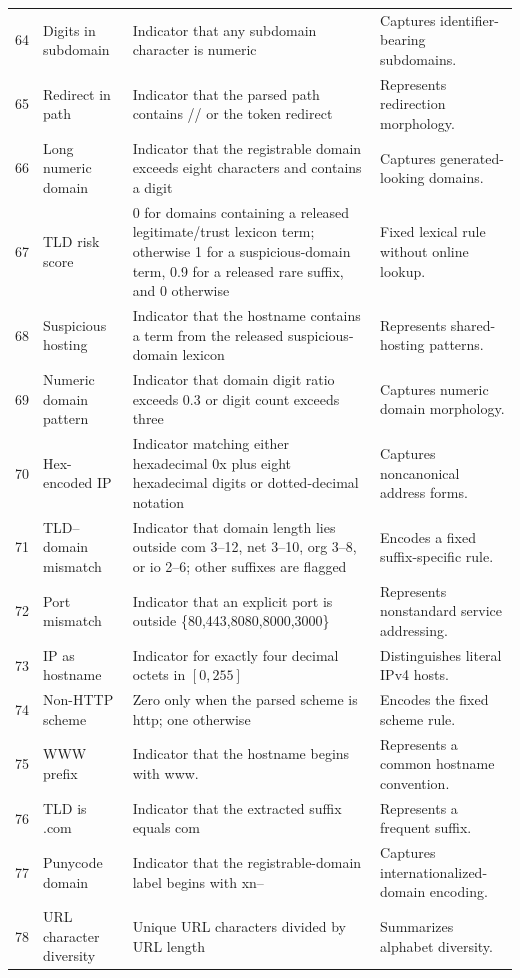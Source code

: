 \documentclass[10pt]{article}
\begin{document}
\begin{longtable}{r L{3.4cm} L{5.1cm} L{6.0cm}}
64 & Digits in subdomain & Indicator that any subdomain character is numeric & Captures identifier-bearing subdomains. \\
65 & Redirect in path & Indicator that the parsed path contains // or the token redirect & Represents redirection morphology. \\
66 & Long numeric domain & Indicator that the registrable domain exceeds eight characters and contains a digit & Captures generated-looking domains. \\
67 & TLD risk score & 0 for domains containing a released legitimate/trust lexicon term; otherwise 1 for a suspicious-domain term, 0.9 for a released rare suffix, and 0 otherwise & Fixed lexical rule without online lookup. \\
68 & Suspicious hosting & Indicator that the hostname contains a term from the released suspicious-domain lexicon & Represents shared-hosting patterns. \\
69 & Numeric domain pattern & Indicator that domain digit ratio exceeds 0.3 or digit count exceeds three & Captures numeric domain morphology. \\
70 & Hex-encoded IP & Indicator matching either hexadecimal 0x plus eight hexadecimal digits or dotted-decimal notation & Captures noncanonical address forms. \\
71 & TLD--domain mismatch & Indicator that domain length lies outside com 3--12, net 3--10, org 3--8, or io 2--6; other suffixes are flagged & Encodes a fixed suffix-specific rule. \\
72 & Port mismatch & Indicator that an explicit port is outside \{80,443,8080,8000,3000\} & Represents nonstandard service addressing. \\
73 & IP as hostname & Indicator for exactly four decimal octets in $[0,255]$ & Distinguishes literal IPv4 hosts. \\
74 & Non-HTTP scheme & Zero only when the parsed scheme is http; one otherwise & Encodes the fixed scheme rule. \\
75 & WWW prefix & Indicator that the hostname begins with www. & Represents a common hostname convention. \\
76 & TLD is .com & Indicator that the extracted suffix equals com & Represents a frequent suffix. \\
77 & Punycode domain & Indicator that the registrable-domain label begins with xn-- & Captures internationalized-domain encoding. \\
78 & URL character diversity & Unique URL characters divided by URL length & Summarizes alphabet diversity. \\

\end{longtable}
\end{document}

